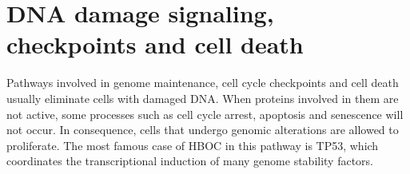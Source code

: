 \documentclass[
  11pt,
]{env/yjiao}
\begin{document}
\hypertarget{dna-damage-signaling-checkpoints-and-cell-death}{%
\section{DNA damage signaling, checkpoints and cell death}\label{dna-damage-signaling-checkpoints-and-cell-death}}

Pathways involved in genome maintenance, cell cycle checkpoints and cell death usually eliminate cells with damaged DNA. When proteins involved in them are not active, some processes such as cell cycle arrest, apoptosis and senescence will not occur. In consequence, cells that undergo genomic alterations are allowed to proliferate. The most famous case of HBOC in this pathway is TP53, which coordinates the transcriptional induction of many genome stability factors.
\end{document}
